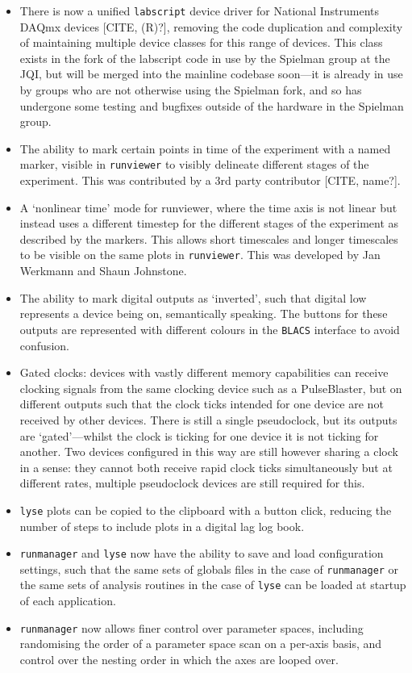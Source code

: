 \begin{itemize}
    \item There is now a unified \texttt{labscript} device driver for National Instruments DAQmx devices [CITE, (R)?], removing the code duplication and complexity of maintaining multiple device classes for this range of devices. This class exists in the fork of the labscript code in use by the Spielman group at the JQI, but will be merged into the mainline codebase soon---it is already in use by groups who are not otherwise using the Spielman fork, and so has undergone some testing and bugfixes outside of the hardware in the Spielman group.
    \item The ability to mark certain points in time of the experiment with a named marker, visible in \texttt{runviewer} to visibly delineate different stages of the experiment. This was contributed by a 3rd party contributor [CITE, name?].
    \item A `nonlinear time' mode for runviewer, where the time axis is not linear but instead uses a different timestep for the different stages of the experiment as described by the markers. This allows short timescales and longer timescales to be visible on the same plots in \texttt{runviewer}. This was developed by Jan Werkmann and Shaun Johnstone.
    \item The ability to mark digital outputs as `inverted', such that digital low represents a device being on, semantically speaking. The buttons for these outputs are represented with different colours in the \texttt{BLACS} interface to avoid confusion.
    \item Gated clocks: devices with vastly different memory capabilities can receive clocking signals from the same clocking device such as a PulseBlaster, but on different outputs such that the clock ticks intended for one device are not received by other devices. There is still a single pseudoclock, but its outputs are `gated'---whilst the clock is ticking for one device it is not ticking for another. Two devices configured in this way are still however sharing a clock in a sense: they cannot both receive rapid clock ticks simultaneously but at different rates, multiple pseudoclock devices are still required for this.
    \item \texttt{lyse} plots can be copied to the clipboard with a button click, reducing the number of steps to include plots in a digital lag log book.
    \item \texttt{runmanager} and \texttt{lyse} now have the ability to save and load configuration settings, such that the same sets of globals files in the case of \texttt{runmanager} or the same sets of analysis routines in the case of \texttt{lyse} can be loaded at startup of each application.
    \item \texttt{runmanager} now allows finer control over parameter spaces, including randomising the order of a parameter space scan on a per-axis basis, and control over the nesting order in which the axes are looped over.
\end{itemize}

